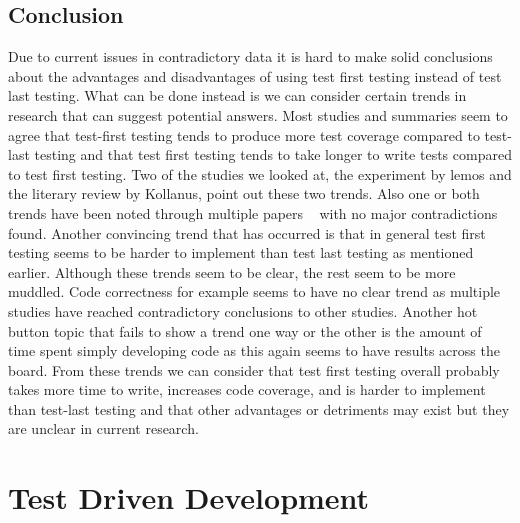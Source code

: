 \documentclass{sig-alternate}
\begin{document}
\subsection{Conclusion}

Due to current issues in contradictory data it is hard to make solid conclusions about the advantages and disadvantages of using test first testing instead of test last testing.  What can be done instead is we can consider certain trends in research that can suggest potential answers.  Most studies and summaries seem to agree that test-first testing tends to produce more test coverage compared to test-last testing and that test first testing tends to take longer to write tests compared to test first testing.  Two of the studies we looked at, the experiment by lemos and the literary review by Kollanus, point out these two trends.  Also one or both trends have been noted through multiple papers ~\cite{Kettunen:2010, Hammond:2012, Hellman:2012} with no major contradictions found.  Another convincing trend that has occurred is that in general test first testing seems to be harder to implement than test last testing as mentioned earlier.   Although these trends seem to be clear, the rest seem to be more muddled.  Code correctness for example seems to have no clear trend as multiple studies have reached contradictory conclusions to other studies.  Another hot button topic that fails to show a trend one way or the other is the amount of time spent simply developing code as this again seems to have results across the board.  From these trends we can consider that test first testing overall probably takes more time to write, increases code coverage, and is harder to implement than test-last testing and that other advantages or detriments may exist but they are unclear in current research.

\section{Test Driven Development}
\end{document}

